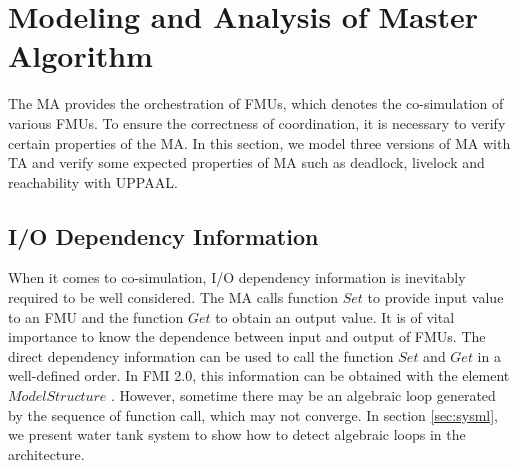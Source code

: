 \section{Modeling and Analysis of Master Algorithm}
\label{sec:ma}
The MA provides the orchestration of FMUs, which denotes the co-simulation of various FMUs. To ensure the correctness of coordination, it is necessary to verify certain properties of the MA. In this section, we model three versions of MA with TA and verify some expected properties of MA such as deadlock, livelock and reachability with UPPAAL.
\subsection{I/O Dependency Information}
When it comes to co-simulation, I/O dependency information \cite{BromanBGLMTW13} is inevitably required to be well considered. The MA calls function $Set$ to provide input value to an FMU and the function $Get$ to obtain an output value. It is of vital importance to know the dependence between input and output of FMUs. The direct dependency information can be used to call the function $Set$ and $Get$ in a well-defined order. In FMI 2.0, this information can be obtained with the element $ModelStructure$ \cite{FMI2INTRO}. However, sometime there may be an algebraic loop generated by the sequence of function call, which may not converge. In section \ref{sec:sysml}, we present water tank system to show how to detect algebraic loops in the architecture.
